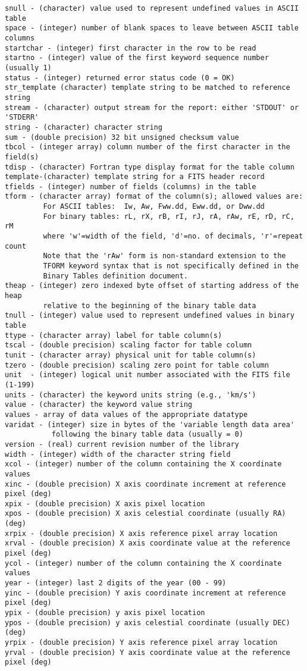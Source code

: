 \documentclass[11pt]{book}
\begin{document}
\begin{verbatim}
snull - (character) value used to represent undefined values in ASCII table
space - (integer) number of blank spaces to leave between ASCII table columns
startchar - (integer) first character in the row to be read
startno - (integer) value of the first keyword sequence number (usually 1)
status - (integer) returned error status code (0 = OK)
str_template (character) template string to be matched to reference string
stream - (character) output stream for the report: either 'STDOUT' or 'STDERR'
string - (character) character string
sum - (double precision) 32 bit unsigned checksum value
tbcol - (integer array) column number of the first character in the field(s)
tdisp - (character) Fortran type display format for the table column
template-(character) template string for a FITS header record
tfields - (integer) number of fields (columns) in the table
tform - (character array) format of the column(s); allowed values are:
         For ASCII tables:  Iw, Aw, Fww.dd, Eww.dd, or Dww.dd
         For binary tables: rL, rX, rB, rI, rJ, rA, rAw, rE, rD, rC, rM
         where 'w'=width of the field, 'd'=no. of decimals, 'r'=repeat count
         Note that the 'rAw' form is non-standard extension to the
         TFORM keyword syntax that is not specifically defined in the
         Binary Tables definition document.
theap - (integer) zero indexed byte offset of starting address of the heap
         relative to the beginning of the binary table data
tnull - (integer) value used to represent undefined values in binary table
ttype - (character array) label for table column(s)
tscal - (double precision) scaling factor for table column
tunit - (character array) physical unit for table column(s)
tzero - (double precision) scaling zero point for table column
unit  - (integer) logical unit number associated with the FITS file (1-199)
units - (character) the keyword units string (e.g., 'km/s')
value - (character) the keyword value string
values - array of data values of the appropriate datatype
varidat - (integer) size in bytes of the 'variable length data area'
           following the binary table data (usually = 0)
version - (real) current revision number of the library
width - (integer) width of the character string field
xcol - (integer) number of the column containing the X coordinate values
xinc - (double precision) X axis coordinate increment at reference pixel (deg)
xpix - (double precision) X axis pixel location
xpos - (double precision) X axis celestial coordinate (usually RA) (deg)
xrpix - (double precision) X axis reference pixel array location
xrval - (double precision) X axis coordinate value at the reference pixel (deg)
ycol - (integer) number of the column containing the X coordinate values
year - (integer) last 2 digits of the year (00 - 99)
yinc - (double precision) Y axis coordinate increment at reference pixel (deg)
ypix - (double precision) y axis pixel location
ypos - (double precision) y axis celestial coordinate (usually DEC) (deg)
yrpix - (double precision) Y axis reference pixel array location
yrval - (double precision) Y axis coordinate value at the reference pixel (deg)
\end{verbatim}

\end{document}
